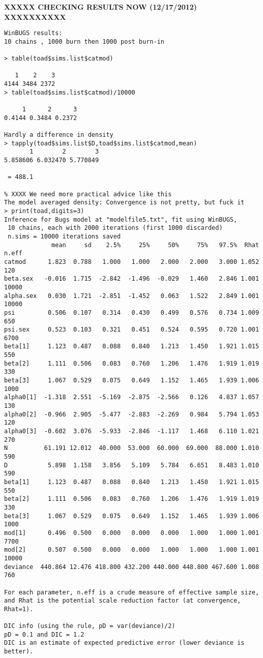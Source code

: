{\bf XXXXX CHECKING RESULTS NOW (12/17/2012) XXXXXXXXXX}
{\small
\begin{verbatim}
WinBUGS results:
10 chains , 1000 burn then 1000 post burn-in

> table(toad$sims.list$catmod)

   1    2    3
4144 3484 2372
> table(toad$sims.list$catmod)/10000

     1      2      3
0.4144 0.3484 0.2372

Hardly a difference in density
> tapply(toad$sims.list$D,toad$sims.list$catmod,mean)
       1        2        3
5.858606 6.032470 5.770849

 = 488.1

% XXXX We need more practical advice like this
The model averaged density: Convergence is not pretty, but fuck it
> print(toad,digits=3)
Inference for Bugs model at "modelfile5.txt", fit using WinBUGS,
 10 chains, each with 2000 iterations (first 1000 discarded)
 n.sims = 10000 iterations saved
             mean     sd    2.5%     25%     50%     75%   97.5%  Rhat n.eff
catmod      1.823  0.788   1.000   1.000   2.000   2.000   3.000 1.052   120
beta.sex   -0.016  1.715  -2.842  -1.496  -0.029   1.460   2.846 1.001 10000
alpha.sex   0.030  1.721  -2.851  -1.452   0.063   1.522   2.849 1.001 10000
psi         0.506  0.107   0.314   0.430   0.499   0.576   0.734 1.009   650
psi.sex     0.523  0.103   0.321   0.451   0.524   0.595   0.720 1.001  6700
beta[1]     1.123  0.487   0.088   0.840   1.213   1.450   1.921 1.015   550
beta[2]     1.111  0.506   0.083   0.760   1.206   1.476   1.919 1.019   330
beta[3]     1.067  0.529   0.075   0.649   1.152   1.465   1.939 1.006  1000
alpha0[1]  -1.318  2.551  -5.169  -2.875  -2.566   0.126   4.837 1.057   130
alpha0[2]  -0.966  2.905  -5.477  -2.883  -2.269   0.984   5.794 1.053   120
alpha0[3]  -0.602  3.076  -5.933  -2.846  -1.117   1.468   6.110 1.021   270
N          61.191 12.012  40.000  53.000  60.000  69.000  88.000 1.010   590
D           5.898  1.158   3.856   5.109   5.784   6.651   8.483 1.010   590
beta[1]     1.123  0.487   0.088   0.840   1.213   1.450   1.921 1.015   550
beta[2]     1.111  0.506   0.083   0.760   1.206   1.476   1.919 1.019   330
beta[3]     1.067  0.529   0.075   0.649   1.152   1.465   1.939 1.006  1000
mod[1]      0.496  0.500   0.000   0.000   0.000   1.000   1.000 1.001  7700
mod[2]      0.507  0.500   0.000   0.000   1.000   1.000   1.000 1.001 10000
deviance  440.864 12.476 418.800 432.200 440.000 448.800 467.600 1.008   760

For each parameter, n.eff is a crude measure of effective sample size,
and Rhat is the potential scale reduction factor (at convergence, Rhat=1).

DIC info (using the rule, pD = var(deviance)/2)
pD = 0.1 and DIC = 1.2
DIC is an estimate of expected predictive error (lower deviance is better).
\end{verbatim}
}






